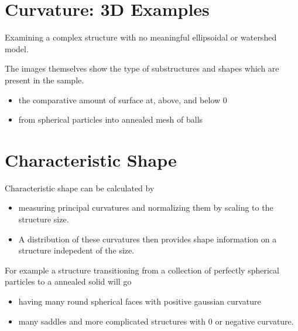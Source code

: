 \documentclass[letterpaper,10pt,english]{sphinxmanual}
\begin{document}
\section{Curvature: 3D Examples}
\label{\detokenize{06-AdvancedShapeAndTexture:curvature-3d-examples}}
\sphinxAtStartPar
Examining a complex structure with no meaningful ellipsoidal or watershed model.

\sphinxAtStartPar
The images themselves show the type of substructures and shapes which are present in the sample.


\begin{itemize}
\item {} 
\sphinxAtStartPar
the comparative amount of surface at, above, and below 0

\item {} 
\sphinxAtStartPar
from spherical particles into annealed mesh of balls

\end{itemize}




\section{Characteristic Shape}
\label{\detokenize{06-AdvancedShapeAndTexture:characteristic-shape}}
\sphinxAtStartPar
Characteristic shape can be calculated by
\begin{itemize}
\item {} 
\sphinxAtStartPar
measuring principal curvatures and normalizing them by scaling to the structure size.

\item {} 
\sphinxAtStartPar
A distribution of these curvatures then provides shape information on a structure indepedent of the size.




\end{itemize}

\sphinxAtStartPar
For example a structure transitioning from a collection of perfectly spherical particles to a annealed solid will go
\begin{itemize}
\item {} 
\sphinxAtStartPar
{} having many round spherical faces with positive gaussian curvature

\item {} 
\sphinxAtStartPar
{} many saddles and more complicated structures with 0 or negative curvature.

\end{itemize}
\end{document}
